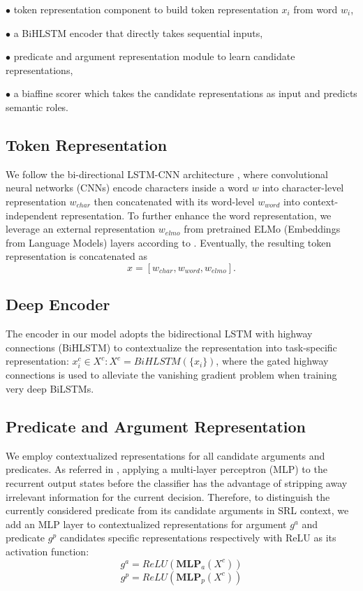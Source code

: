 \documentclass[letterpaper]{article} \usepackage{aaai19}  \usepackage{times}  \usepackage{helvet}  \usepackage{courier}  \usepackage{url}  \usepackage{graphicx}  \frenchspacing  \setlength{\pdfpagewidth}{8.5in}  \setlength{\pdfpageheight}{11in}
\begin{document}
$\bullet$ token representation component to build token representation $x_i$ from word $w_i$,

$\bullet$ a BiHLSTM encoder that directly takes sequential inputs,

$\bullet$ predicate and argument representation module to learn candidate representations,

$\bullet$ a biaffine scorer which takes the candidate representations as input and predicts semantic roles.





\subsection{Token Representation}
We follow the bi-directional LSTM-CNN architecture \cite{chiu2016named}, where convolutional neural networks (CNNs) encode characters inside a word $w$ into character-level representation $w_{char}$ then concatenated with its word-level $w_{word}$ into context-independent representation. To further enhance the word representation, we leverage an external representation $w_{elmo}$ from pretrained ELMo (Embeddings from Language Models) layers according to \citeauthor{ELMo} . 
Eventually, the resulting token representation is concatenated as 
\begin{equation}
x = [w_{char} , w_{word} , w_{elmo}].\nonumber
\end{equation}




\subsection{Deep Encoder}

The encoder in our model adopts the bidirectional LSTM with highway connections (BiHLSTM) to contextualize the representation into task-specific representation: 
$x^c_i \in X^c: X^c = \textit{BiHLSTM}(\{x_i\}) $,
where the gated highway connections is used to alleviate the vanishing gradient problem when training very deep BiLSTMs.


\subsection{Predicate and Argument Representation}

We employ contextualized representations for all candidate arguments and predicates. As referred in \cite{dozat2017deep}, applying a multi-layer perceptron (MLP) to the recurrent output states before the classifier has the advantage of stripping away irrelevant information for the current decision. Therefore, to distinguish the currently considered predicate from its candidate arguments in SRL context, we add an MLP layer to contextualized representations for argument $g^a$ and predicate $g^p$ candidates specific representations respectively with ReLU \cite{nair2010rectified} as its activation function:
$$g^a = \textit{ReLU}(\textbf{MLP}_a (X^c))$$
$$g^p = \textit{ReLU}(\textbf{MLP}_p (X^c))$$
\end{document}
